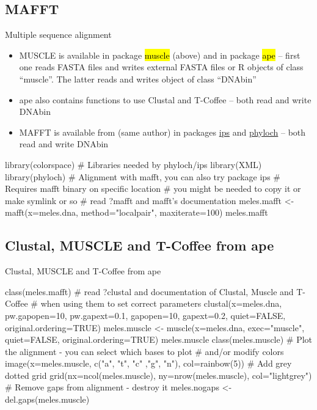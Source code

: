\documentclass[compress, ucs, xelatex, 11pt, xcolor=svgnames,
  hyperref={
    bookmarks=true,
    unicode=true,
    colorlinks=true,
    pdftitle={Molecular data in R},
    plainpages=false,
    pdfauthor={Vojtech Zeisek},
    pdfsubject={Course about phylogeny and evolution in R},
    pdfcreator={XeLaTeX},
    pdfkeywords={R, evolution, phylogeny, molecular data},
    linkcolor=Tomato,
    anchorcolor=SaddleBrown,
    citecolor=Goldenrod,
    filecolor=DarkMagenta,
    menucolor=Sienna,
    urlcolor=DarkTurquoise,
    pdftex},
  url={hyphens, lowtilde} %
  ]{beamer}
\renewcommand{\texttt}[1]{\hl{\ttfamily #1}}
\begin{document}
\subsection{MAFFT}

\begin{frame}[fragile]{Multiple sequence alignment}
\begin{itemize}
 \item MUSCLE is available in package \texttt{muscle} (above) and in package \texttt{ape} -- first one reads FASTA files and writes external FASTA files or R objects of class ``muscle''. The latter reads and writes object of class ``DNAbin''
 \item ape also contains functions to use Clustal and T-Coffee -- both read and write DNAbin
 \item MAFFT is available from (same author) in packages \href{https://cran.r-project.org/web/packages/ips/index.html}{ips} and \href{http://www.christophheibl.de/Rpackages.html}{phyloch} -- both read and write DNAbin
\end{itemize}
  \begin{spluscode}
    library(colorspace) # Libraries needed by phyloch/ips
    library(XML)
    library(phyloch) # Alignment with mafft, you can also try package ips
    # Requires mafft binary on specific location
    # you might be needed to copy it or make symlink or so
    # read ?mafft and mafft's documentation
    meles.mafft <- mafft(x=meles.dna, method="localpair", maxiterate=100)
    meles.mafft
  \end{spluscode}
\end{frame}

\subsection{Clustal, MUSCLE and T-Coffee from ape}

\begin{frame}[fragile]{Clustal, MUSCLE and T-Coffee from ape}
  \begin{spluscode}
    class(meles.mafft)
    # read ?clustal and documentation of Clustal, Muscle and T-Coffee
    # when using them to set correct parameters
    clustal(x=meles.dna, pw.gapopen=10, pw.gapext=0.1, gapopen=10,
      gapext=0.2, quiet=FALSE, original.ordering=TRUE)
    meles.muscle <- muscle(x=meles.dna, exec="muscle",
      quiet=FALSE, original.ordering=TRUE)
    meles.muscle
    class(meles.muscle)
    # Plot the alignment - you can select which bases to plot
    # and/or modify colors
    image(x=meles.muscle, c("a", "t", "c" ,"g", "n"), col=rainbow(5))
    # Add grey dotted grid
    grid(nx=ncol(meles.muscle), ny=nrow(meles.muscle), col="lightgrey")
    # Remove gaps from alignment - destroy it
    meles.nogaps <- del.gaps(meles.muscle)
  \end{spluscode}
\end{frame}
\end{document}
